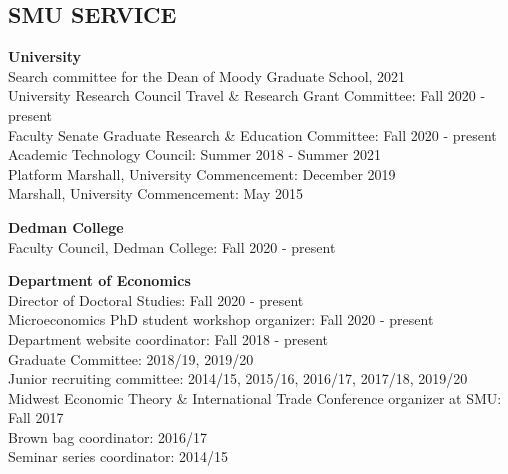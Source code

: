 \documentclass[11pt]{res}
\begin{document}
\begin{resume}
\section{SMU SERVICE} \vspace{1.5mm}
\textbf{University}\vspace{1.5mm}\\
Search committee for the Dean of Moody Graduate School, 2021\vspace{1.5mm}\\
University Research Council Travel \& Research Grant Committee: Fall 2020 - present\vspace{1.5mm}\\
Faculty Senate Graduate Research \& Education Committee: Fall 2020 - present\vspace{1.5mm}\\
Academic Technology Council: Summer 2018 - Summer 2021\vspace{1.5mm}\\
Platform Marshall, University Commencement: December 2019\vspace{1.5mm}\\
Marshall, University Commencement: May 2015

\textbf{Dedman College}\vspace{1.5mm}\\
Faculty Council, Dedman College: Fall 2020 - present

\textbf{Department of Economics}\vspace{1.5mm}\\
Director of Doctoral Studies: Fall 2020 - present\vspace{1.5mm}\\
Microeconomics PhD student workshop organizer: Fall 2020 - present\vspace{1.5mm}\\
Department website coordinator: Fall 2018 - present\vspace{1.5mm}\\
Graduate Committee: 2018/19, 2019/20\vspace{1.5mm}\\
Junior recruiting committee: 2014/15, 2015/16, 2016/17, 2017/18, 2019/20\vspace{1.5mm}\\
Midwest Economic Theory \& International Trade Conference organizer at SMU: Fall 2017\vspace{1.5mm}\\
Brown bag coordinator: 2016/17\vspace{1.5mm}\\
Seminar series coordinator: 2014/15

\end{resume}
\end{document}
